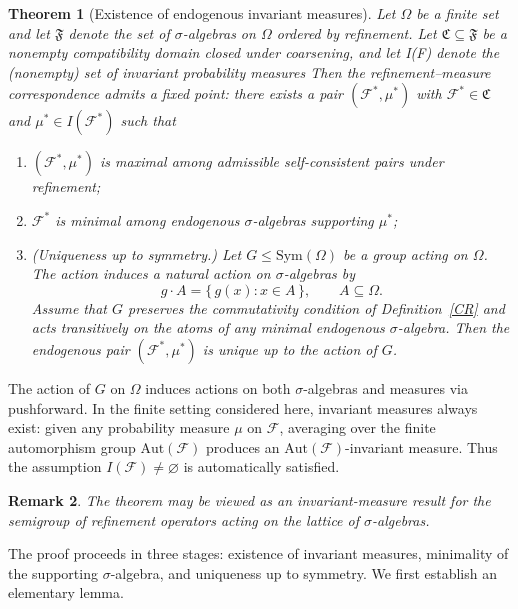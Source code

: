 \documentclass[
 amsmath,amssymb,
  onecolumn %
]{revtex4-2}
\newtheorem{theorem}{Theorem} [section]
\newtheorem{remark}[theorem]{Remark}
\begin{document}
\begin{theorem}[Existence of endogenous invariant measures]\label{th:endogenous}
Let $\Omega$ be a finite set and let $\mathfrak F$ denote the set of
$\sigma$-algebras on $\Omega$ ordered by refinement.
Let $\mathfrak C\subseteq\mathfrak F$ be a nonempty compatibility domain
closed under coarsening, and let I(F) denote the (nonempty) set of invariant probability measures
Then the refinement–measure correspondence admits a fixed point:
there exists a pair $(\mathcal F^\ast,\mu^\ast)$ with
$\mathcal F^\ast\in\mathfrak C$ and $\mu^\ast\in I(\mathcal F^\ast)$ such that

\begin{enumerate}[label=(\roman*),leftmargin=2.5em]

\item $(\mathcal F^\ast,\mu^\ast)$ is maximal among admissible
self-consistent pairs under refinement;

\item $\mathcal F^\ast$ is minimal among endogenous $\sigma$-algebras
supporting $\mu^\ast$;

\item (Uniqueness up to symmetry.)
Let $G\leq\mathrm{Sym}(\Omega)$ be a group acting on $\Omega$.
The action induces a natural action on $\sigma$-algebras by
\[
g\cdot A = \{\, g(x) : x\in A \,\}, \qquad A\subseteq\Omega .
\]
Assume that $G$ preserves the commutativity condition of
Definition~\ref{CR} and acts transitively on the atoms of any
minimal endogenous $\sigma$-algebra.
Then the endogenous pair $(\mathcal F^\ast,\mu^\ast)$ is unique
up to the action of $G$.
\end{enumerate}
\end{theorem}
The action of $G$ on $\Omega$ induces actions on both
$\sigma$-algebras and measures via pushforward.
In the finite setting considered here, invariant measures always exist:
given any probability measure $\mu$ on $\mathcal F$, averaging over the
finite automorphism group $\mathrm{Aut}(\mathcal F)$ produces an
$\mathrm{Aut}(\mathcal F)$-invariant measure.
Thus the assumption $I(\mathcal F)\neq\varnothing$ is automatically satisfied.

\begin{remark}
The theorem may be viewed as an invariant-measure result for the
semigroup of refinement operators acting on the lattice of
$\sigma$-algebras.
\end{remark}

The proof proceeds in three stages: existence of invariant measures,
minimality of the supporting $\sigma$-algebra, and uniqueness up to symmetry. We first establish an elementary lemma.
\end{document}
